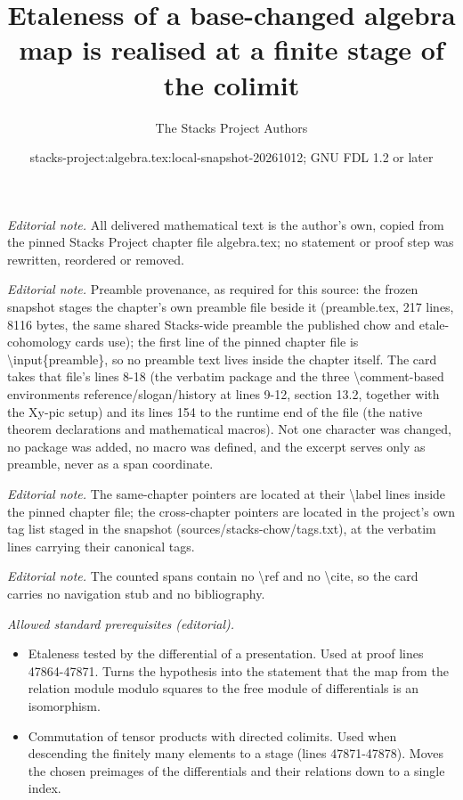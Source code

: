 \documentclass[10pt,a4paper]{amsart}
\title{Etaleness of a base-changed algebra map is realised at a finite stage of the colimit}
\author{The Stacks Project Authors}
\date{stacks-project:algebra.tex:local-snapshot-20261012; GNU FDL 1.2 or later}
\theoremstyle{plain}
\theoremstyle{definition}
\theoremstyle{remark}
\numberwithin{equation}{subsection}
\begin{document}
\maketitle
\noindent\textit{Editorial note.} All delivered mathematical text is the author's own, copied from the pinned Stacks Project chapter file algebra.tex; no statement or proof step was rewritten, reordered or removed.\par\medskip
\noindent\textit{Editorial note.} Preamble provenance, as required for this source: the frozen snapshot stages the chapter's own preamble file beside it (preamble.tex, 217 lines, 8116 bytes, the same shared Stacks-wide preamble the published chow and etale-cohomology cards use); the first line of the pinned chapter file is \textbackslash{}input\{preamble\}, so no preamble text lives inside the chapter itself. The card takes that file's lines 8-18 (the verbatim package and the three \textbackslash{}comment-based environments reference/slogan/history at lines 9-12, section 13.2, together with the Xy-pic setup) and its lines 154 to the runtime end of the file (the native theorem declarations and mathematical macros). Not one character was changed, no package was added, no macro was defined, and the excerpt serves only as preamble, never as a span coordinate.\par\medskip
\noindent\textit{Editorial note.} The same-chapter pointers are located at their \textbackslash{}label lines inside the pinned chapter file; the cross-chapter pointers are located in the project's own tag list staged in the snapshot (sources/stacks-chow/tags.txt), at the verbatim lines carrying their canonical tags.\par\medskip
\noindent\textit{Editorial note.} The counted spans contain no \textbackslash{}ref and no \textbackslash{}cite, so the card carries no navigation stub and no bibliography.\par\medskip
\noindent\textit{Allowed standard prerequisites (editorial).}\begin{itemize}
\item Etaleness tested by the differential of a presentation. Used at proof lines 47864-47871. Turns the hypothesis into the statement that the map from the relation module modulo squares to the free module of differentials is an isomorphism.
\item Commutation of tensor products with directed colimits. Used when descending the finitely many elements to a stage (lines 47871-47878). Moves the chosen preimages of the differentials and their relations down to a single index.
\end{itemize}\medskip
\end{document}

